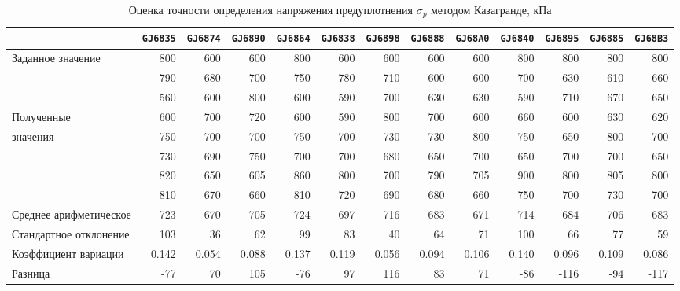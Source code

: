 \begin{sidewaystable}[p]
    \centering
    \small
    \caption{Оценка точности определения напряжения предуплотнения $\sigma_p$ методом Казагранде, кПа} \label{tab:accuracy-caz}
    \begin{tabular}{@{}lrrrrrrrrrrrr@{}}
    \toprule
     & \texttt{GJ6835} & \texttt{GJ6874} & \texttt{GJ6890} & \texttt{GJ6864} & \texttt{GJ6838} & \texttt{GJ6898} & \texttt{GJ6888} & \texttt{GJ68A0} & \texttt{GJ6840} & \texttt{GJ6895} & \texttt{GJ6885} & \texttt{GJ68B3} \\
    \midrule
    Заданное значение & 800 & 600 & 600 & 800 & 600 & 600 & 600 & 600 & 800 & 800 & 800 & 800 \\
    \midrule
     & 790 & 680 & 700 & 750 & 780 & 710 & 600 & 600 & 700 & 630 & 610 & 660 \\
     & 560 & 600 & 800 & 600 & 590 & 700 & 630 & 630 & 590 & 710 & 670 & 650 \\
    Полученные & 600 & 700 & 720 & 600 & 590 & 800 & 700 & 600 & 660 & 600 & 630 & 620 \\
    значения & 750 & 700 & 700 & 750 & 700 & 730 & 730 & 800 & 750 & 650 & 800 & 700 \\
     & 730 & 690 & 750 & 700 & 700 & 680 & 650 & 700 & 650 & 700 & 700 & 650 \\
     & 820 & 650 & 605 & 860 & 800 & 700 & 790 & 705 & 900 & 800 & 805 & 800 \\
     & 810 & 670 & 660 & 810 & 720 & 690 & 680 & 660 & 750 & 700 & 730 & 700 \\
    \midrule
    Среднее арифметическое & 723 & 670 & 705 & 724 & 697 & 716 & 683 & 671 & 714 & 684 & 706 & 683 \\
    Стандартное отклонение & 103 & 36 & 62 & 99 & 83 & 40 & 64 & 71 & 100 & 66 & 77 & 59 \\
    Коэффициент вариации & 0.142 & 0.054 & 0.088 & 0.137 & 0.119 & 0.056 & 0.094 & 0.106 & 0.140 & 0.096 & 0.109 & 0.086 \\
    \midrule
    Разница & -77 & 70 & 105 & -76 & 97 & 116 & 83 & 71 & -86 & -116 & -94 & -117 \\
    \bottomrule
    \end{tabular}
    \\ 
\end{sidewaystable}


